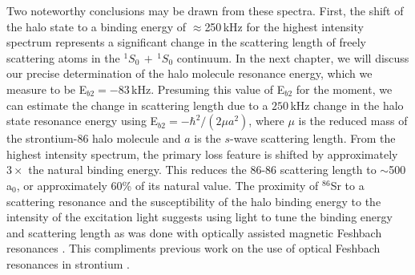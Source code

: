 Two noteworthy conclusions may be drawn from these spectra.
First, the shift of the halo state to a binding energy of $\approx$250\,kHz for the highest intensity spectrum represents a significant change in the scattering length of freely scattering atoms in the $^1S_0\,+\,^1S_0$ continuum.
In the next chapter, we will discuss our precise determination of the halo molecule resonance energy, which we measure to be E$_{b2}=-83$\,kHz.
Presuming this value of E$_{b2}$ for the moment, we can estimate the change in scattering length due to a $250$\,kHz change in the halo state resonance energy using E$_{b2}=-\hbar^2/(2 \mu a^2)$, where $\mu$ is the reduced mass of the strontium-86 halo molecule and $a$ is the $s$-wave scattering length.
From the highest intensity spectrum, the primary loss feature is shifted by approximately $3\times$ the natural binding energy.
This reduces the $86$-$86$ scattering length to $\sim$500\,a$_0$, or approximately $60$\% of its natural value.
The proximity of $^{86}$Sr to a scattering resonance and the susceptibility of the halo binding energy to the intensity of the excitation light suggests using light to tune the binding energy and scattering length as was done with optically assisted magnetic Feshbach resonances \cite{blv09,chx15}.
This compliments previous work on the use of optical Feshbach resonances in strontium \cite{fks96,Theis2004,Yamazaki2010,Blatt,Yan2013c}. 

